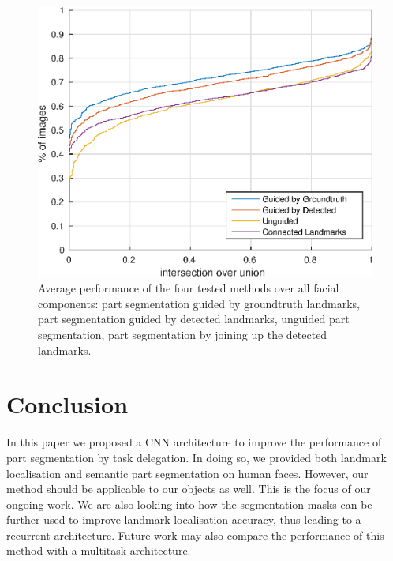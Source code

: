 \begin{figure}
\centering
\includegraphics[width=0.6\linewidth]{figs/all.eps}
\caption[Average images and their output from facial part
  segmentation]{Average performance of the four tested methods over
  all facial components: part segmentation guided by groundtruth
  landmarks, part segmentation guided by detected landmarks, unguided
  part segmentation, part segmentation by joining up the detected
  landmarks.}
\label{fig:all}
\end{figure}


\section{Conclusion}

In this paper we proposed a CNN architecture to improve the
performance of part segmentation by task delegation. In doing so, we
provided both landmark localisation and semantic part segmentation on
human faces. However, our method should be applicable to our objects
as well. This is the focus of our ongoing work. We are also looking
into how the segmentation masks can be further used to improve
landmark localisation accuracy, thus leading to a recurrent
architecture. Future work may also compare the performance of this
method with a multitask architecture.

